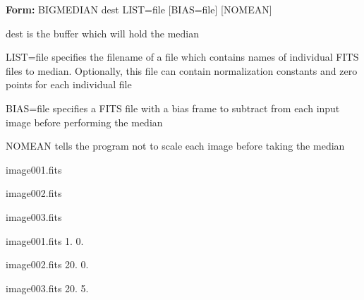 {\newpage\clearpage
{}%
\begin{command}
  \item[\textbf{Form: }BIGMEDIAN dest LIST=file {[BIAS=file]} 
       {[NOMEAN]}\hfill]{}
  \item[dest]{is the buffer which will hold the median}
  \item[LIST=file]{specifies the filename of a file which contains
       names of individual FITS files to median. Optionally,
       this file can contain normalization constants and
       zero points for each individual file}
  \item[BIAS=file]{specifies a FITS file with a bias frame to subtract
       from each input image before performing the median}
  \item[NOMEAN]{tells the program not to scale each image 
       before taking the median}
\end{command}%
\lthtmlfigureZ
\lthtmlcheckvsize\clearpage}

{\newpage\clearpage
{}%
\begin{hanging}
  \item{image001.fits}
  \item{image002.fits}
  \item{image003.fits}
\end{hanging}%
\lthtmlfigureZ
\lthtmlcheckvsize\clearpage}

{\newpage\clearpage
{}%
\begin{hanging}
  \item{image001.fits    1.   0.}
  \item{image002.fits   20.   0.}
  \item{image003.fits   20.   5.}
\end{hanging}%
\lthtmlfigureZ
\lthtmlcheckvsize\clearpage}

